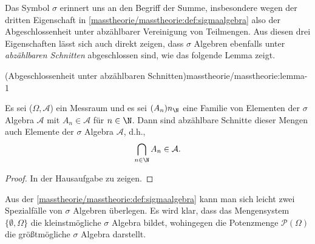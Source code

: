 \documentclass[letterpaper,10pt,english]{jupyterBook}
\begin{document}
\par
Das Symbol \(\sigma\) erinnert uns an den Begriff der Summe, insbesondere wegen der dritten Eigenschaft in \cref{masstheorie/masstheorie:def:sigmaalgebra}  also der Abgeschlossenheit unter abzählbarer Vereinigung von Teilmengen.
Aus diesen drei Eigenschaften lässt sich auch direkt zeigen, dass \(\sigma\) Algebren ebenfalls unter \emph{abzählbaren Schnitten} abgeschlossen sind, wie das folgende Lemma zeigt.
\begin{lemma}{(Abgeschlossenheit unter abzählbaren Schnitten)}{masstheorie/masstheorie:lemma-1}



\par
Es sei (\(\Omega,\mathcal{A}\)) ein Messraum und es sei \((A_n)n_\N\) eine Familie von Elementen der \(\sigma\) Algebra \(\mathcal{A}\) mit \(A_n \in \mathcal{A}\) für \(n \in \N\).
Dann sind abzählbare Schnitte dieser Mengen auch Elemente der \(\sigma\) Algebra \(\mathcal{A}\), d.h.,
\begin{align*}
\bigcap_{n \in \N} A_n \in \mathcal{A}.
\end{align*}\end{lemma}

\begin{proof}
 In der Hausaufgabe zu zeigen.
\end{proof}

\par
Aus der \cref{masstheorie/masstheorie:def:sigmaalgebra} kann man sich leicht zwei Spezialfälle von \(\sigma\) Algebren überlegen.
Es wird klar, dass das Mengensystem \(\{\emptyset, \Omega\}\) die kleinstmögliche \(\sigma\) Algebra bildet, wohingegen die Potenzmenge \(\mathcal{P}(\Omega)\) die größtmögliche \(\sigma\) Algebra darstellt.
\end{document}

